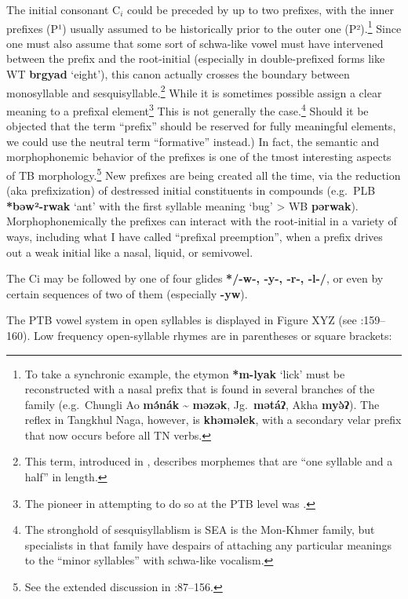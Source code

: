 The initial consonant $\textrm{C}_i$ could be preceded by up to two prefixes, with the inner prefixes (P¹) usually assumed to be historically prior to the outer one (P²).\footnote{To take a synchronic example, the etymon \textbf{*m-lyak} ‘lick’ must be reconstructed with a nasal prefix that is found in several branches of the family (e.g.\ Chungli Ao \textbf{mə́nák} \textasciitilde{} \textbf{məzək}, Jg.~\textbf{mətáʔ}, Akha \textbf{myə̀ʔ}). The reflex in Tangkhul Naga, however, is \textbf{khəməlek}, with a secondary velar prefix that now occurs before all TN verbs.}
Since one must also assume that some sort of schwa-like vowel must have intervened between the prefix and the root-initial (especially in double-prefixed forms like WT \textbf{brgyad} ‘eight’), this canon actually crosses the boundary between monosyllable and sesquisyllable.\footnote{This term, introduced in \citealt{JAM-TSEA}, describes morphemes that are “one syllable and a half” in length.} While it is sometimes possible assign a clear meaning to a prefixal element\footnote{The pioneer in attempting to do so at the PTB level was \citealt{WOL1929}.} This is not generally the case.\footnote{The stronghold of sesquisyllablism is SEA is the Mon-Khmer family, but specialists in that family have despairs of attaching any particular meanings to the “minor syllables” with schwa-like vocalism.}  Should it be objected that the term “prefix” should be reserved for fully meaningful elements, we could use the neutral term “formative” instead.)
In fact, the semantic and morphophonemic behavior of the prefixes is one of the tmost interesting aspects of TB morphology.\footnote{See the extended discussion in \textit{}:87–156.} New prefixes are being created all the time, via the reduction (aka prefixization) of destressed initial constituents in compounds (e.g.\ PLB \textbf{*bəw²-rwak} ‘ant’ with the first syllable meaning ‘bug’ > WB \textbf{pərwak}). 
Morphophonemically the prefixes can interact with the root-initial in a variety of ways, including what I have called “prefixal preemption”, when a prefix drives out a weak initial like a nasal, liquid, or semivowel.

The Ci may be followed by one of four glides \textbf{*/-w-, -y-, -r-, -l-/}, or even by certain sequences of two of them (especially \textbf{-yw}).

The PTB vowel system in open syllables is displayed in Figure XYZ (see \textit{}:159–160). Low frequency open-syllable rhymes are in parentheses or square brackets:

